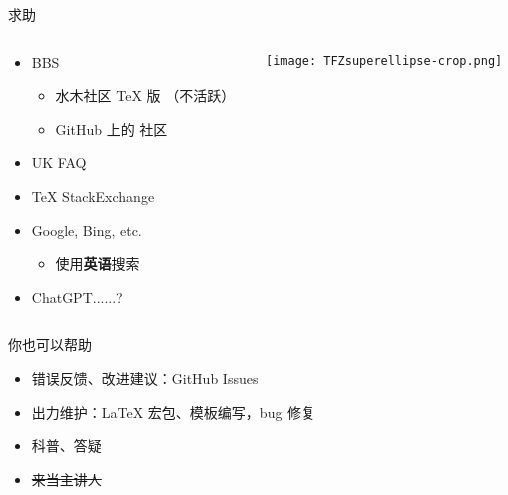 \begin{frame}{求助}
  \begin{columns}[c]
    \begin{column}{.45\textwidth}
      \begin{itemize}
        \item BBS
          \begin{itemize}
            \item 水木社区 TeX 版 （不活跃）
            \item GitHub 上的 \CTeX 社区 
          \end{itemize}
        \item UK FAQ 
        \item \TeX{} StackExchange 
        \item Google, Bing, etc.
          \begin{itemize}
            \item 使用\textbf{英语}搜索
          \end{itemize}
        \item ChatGPT......?
      \end{itemize}
    \end{column}
    \begin{column}{.45\textwidth}
      \texttt{[image: TFZsuperellipse-crop.png]}
    \end{column}
  \end{columns}
\end{frame}

\begin{frame}{你也可以帮助}
  \begin{itemize}
    \item 错误反馈、改进建议：GitHub Issues 
    \item 出力维护：\LaTeX{} 宏包、模板编写，bug 修复
    \item 科普、答疑 
    \item \sout{来当主讲人}
  \end{itemize}
\end{frame}

